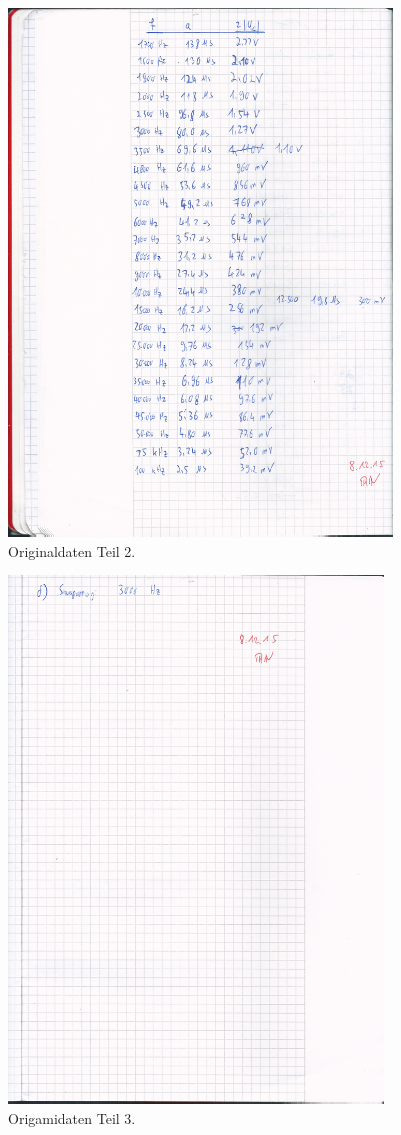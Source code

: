 \begin{figure}[H]
  \centering
  \includegraphics[height=14cm]{original2.png}
  \caption{Originaldaten Teil 2.}
  \label{fig:original2}
\end{figure}

\begin{figure}[H]
  \centering
  \includegraphics[height=14cm]{original3.png}
  \caption{Origamidaten Teil 3.}
  \label{fig:original3}
\end{figure}

\printbibliography


